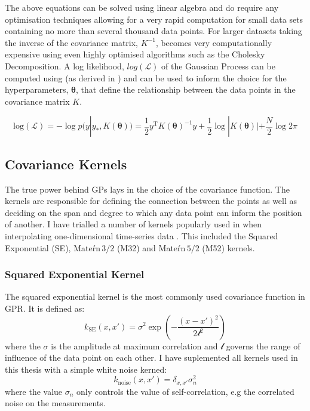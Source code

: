 The above equations can be solved using linear algebra and do require any optimisation techniques allowing for a very rapid computation for small data sets containing no more than several thousand data points. For larger datasets taking the inverse of the covariance matrix, $K^{-1}$, becomes very computationally expensive using even highly optimised algorithms such as the Cholesky Decomposition. A log likelihood, $log(\mathcal{L})$ of the Gaussian Process can be computed using  (as derived in \citet{Rasmussen2006}) and can be used to inform the choice for the hyperparameters, $\mathbf{\theta}$, that define the relationship between the data points in the covariance matrix $K$.

\begin{equation} \label{eg:logGP}
\mathrm{log(\mathcal{L})} = - \log p(y|y_*, K(\mathbf{\theta})) = \frac{1}{2} y^{\mathrm{T}} K(\mathbf{\theta})^{-1} y + \frac{1}{2} \log |K(\mathbf{\theta})| + \frac{N}{2} \log 2 \pi
\end{equation}

\subsection{Covariance Kernels} \label{sec:GPkernels}
The true power behind GPs lays in the choice of the covariance function. The kernels are responsible for defining the connection between the points as well as deciding on the span and degree to which any data point can inform the position of another. I have trialled a number of kernels popularly used in when interpolating one-dimensional time-series data \citep{Rasmussen2006}. This included the Squared Exponential (SE), Mate\'rn\,$3/2$ (M32) and Mate\'rn\,$5/2$ (M52) kernels.

\subsubsection{Squared Exponential Kernel}
The squared exponential kernel is the most commonly used covariance function in GPR. It is defined as:
\begin{equation}
  k_{\textrm{SE}}(x,x') = \sigma^2 \exp\left(-\frac{(x - x')^2}{2\mathcal{l}^2}\right)
\end{equation}
\noindent where the $\sigma$ is the amplitude at maximum correlation and $\mathcal{l}$ governs the range of influence of the data point on each other. I have suplemented all kernels used in this thesis with a simple white noise kerned:
\begin{equation}
  k_{\textrm{noise}}(x,x') = \delta_{x,x'}\sigma_n^2
\end{equation}
\noindent where the value $\sigma_n$ only controls the value of self-correlation, e.g the correlated noise on the measurements.

